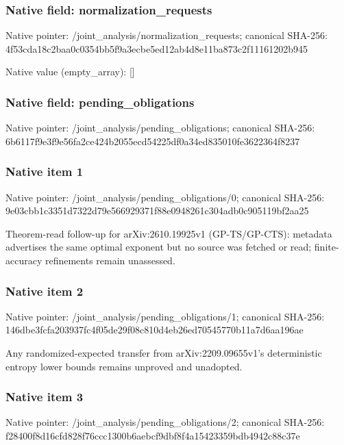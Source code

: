\documentclass[10pt,a4paper]{article}
\begin{document}
\subsubsection{Native field: normalization\_\allowbreak{}requests}
Native pointer: /joint\_\allowbreak{}analysis/normalization\_\allowbreak{}requests; canonical SHA-256: 4f53cda18c2baa0c0354bb5f9a3ecbe5ed12ab4d8e11ba873c2f11161202b945

Native value (empty\_\allowbreak{}array): []

\subsubsection{Native field: pending\_\allowbreak{}obligations}
Native pointer: /joint\_\allowbreak{}analysis/pending\_\allowbreak{}obligations; canonical SHA-256: 6b6117f9e3f9e56fa2ce424b2055ecd54225df0a34ed835010fe3622364f8237

\subsubsection{Native item 1}
Native pointer: /joint\_\allowbreak{}analysis/pending\_\allowbreak{}obligations/0; canonical SHA-256: 9e03cbb1c3351d7322d79e566929371f88e0948261c304adb0c905119bf2aa25

\begingroup\raggedright\sloppy Theorem-read follow-up for arXiv:\allowbreak{}2610.19925v1 (GP-TS/\allowbreak{}GP-CTS):\allowbreak{} metadata advertises the same optimal exponent but no source was fetched or read;\allowbreak{} finite-accuracy refinements remain unassessed.\par\endgroup

\subsubsection{Native item 2}
Native pointer: /joint\_\allowbreak{}analysis/pending\_\allowbreak{}obligations/1; canonical SHA-256: 146dbe3fcfa203937fc4f05de29f08c810d4eb26ed70545770b11a7d6aa196ae

\begingroup\raggedright\sloppy Any randomized-expected transfer from arXiv:\allowbreak{}2209.09655v1's deterministic entropy lower bounds remains unproved and unadopted.\par\endgroup

\subsubsection{Native item 3}
Native pointer: /joint\_\allowbreak{}analysis/pending\_\allowbreak{}obligations/2; canonical SHA-256: f28400f8d16cfd828f76ccc1300b6aebcf9dbf8f4a15423359bdb4942c88c37e
\end{document}
